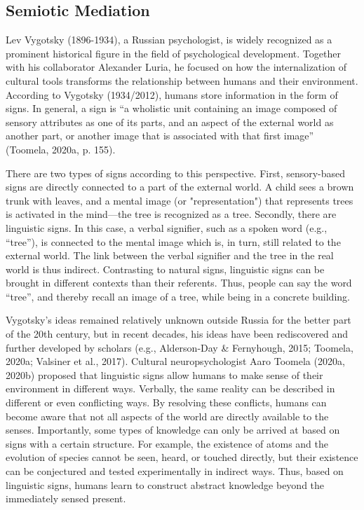 \documentclass[authordate, reflection]{jote-new-article}
\begin{document}
	\subsection{Semiotic Mediation}



	Lev Vygotsky (1896-1934), a Russian psychologist, is widely recognized as a prominent historical figure in the field of psychological development. Together with his collaborator Alexander Luria, he focused on how the internalization of cultural tools transforms the relationship between humans and their environment. According to Vygotsky (1934/2012), humans store information in the form of signs. In general, a sign is “a wholistic unit containing an image composed of sensory attributes as one of its parts, and an aspect of the external world as another part, or another image that is associated with that first image” (Toomela, 2020a, p. 155).



	There are two types of signs according to this perspective. First, sensory-based signs are directly connected to a part of the external world. A child sees a brown trunk with leaves, and a mental image (or "representation") that represents trees is activated in the mind—the tree is recognized as a tree. Secondly, there are linguistic signs. In this case, a verbal signifier, such as a spoken word (e.g., “tree”), is connected to the mental image which is, in turn, still related to the external world. The link between the verbal signifier and the tree in the real world is thus indirect. Contrasting to natural signs, linguistic signs can be brought in different contexts than their referents. Thus, people can say the word “tree”, and thereby recall an image of a tree, while being in a concrete building.



	Vygotsky's ideas remained relatively unknown outside Russia for the better part of the 20th century, but in recent decades, his ideas have been rediscovered and further developed by scholars (e.g., Alderson-Day \& Fernyhough, 2015; Toomela, 2020a; Valsiner et al., 2017). Cultural neuropsychologist Aaro Toomela (2020a, 2020b) proposed that linguistic signs allow humans to make sense of their environment in different ways. Verbally, the same reality can be described in different or even conflicting ways. By resolving these conflicts, humans can become aware that not all aspects of the world are directly available to the senses. Importantly, some types of knowledge can only be arrived at based on signs with a certain structure. For example, the existence of atoms and the evolution of species cannot be seen, heard, or touched directly, but their existence can be conjectured and tested experimentally in indirect ways. Thus, based on linguistic signs, humans learn to construct abstract knowledge beyond the immediately sensed present.
\end{document}
